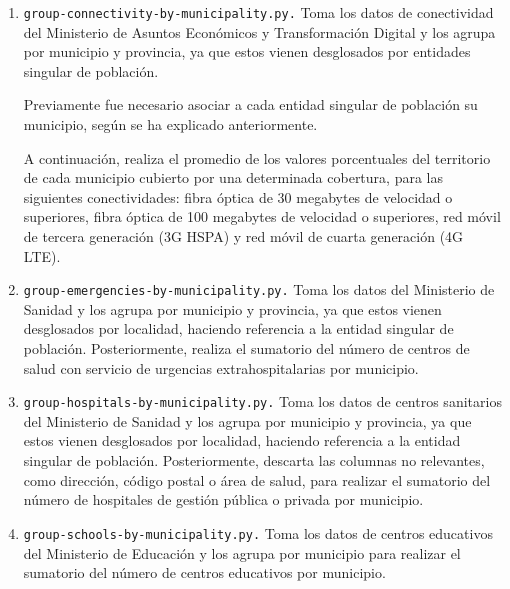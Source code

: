 \begin{enumerate}
    \item \texttt{group-connectivity-by-municipality.py.} Toma los datos de conectividad del Ministerio de Asuntos Económicos y Transformación Digital y los agrupa por municipio y provincia, ya que estos vienen desglosados por entidades singular de población.

    
    Previamente fue necesario asociar a cada entidad singular de población su municipio, según se ha explicado anteriormente.

    
    A continuación, realiza el promedio de los valores porcentuales del territorio de cada municipio cubierto por una determinada cobertura, para las siguientes conectividades: fibra óptica de 30 megabytes de velocidad o superiores, fibra óptica de 100 megabytes de velocidad o superiores, red móvil de tercera generación (3G HSPA) y red móvil de cuarta generación (4G LTE).

    \item \texttt{group-emergencies-by-municipality.py.} Toma los datos del Ministerio de Sanidad y los agrupa por municipio y provincia, ya que estos vienen desglosados por localidad, haciendo referencia a la entidad singular de población. Posteriormente, realiza el sumatorio del número de centros de salud con servicio de urgencias extrahospitalarias por municipio.

    \item \texttt{group-hospitals-by-municipality.py.} Toma los datos de centros sanitarios del Ministerio de Sanidad y los agrupa por municipio y provincia, ya que estos vienen desglosados por localidad, haciendo referencia a la entidad singular de población. Posteriormente, descarta las columnas no relevantes, como dirección, código postal o área de salud, para realizar el sumatorio del número de hospitales de gestión pública o privada por municipio.
    
    \item \texttt{group-schools-by-municipality.py.} Toma los datos de centros educativos del Ministerio de Educación y los agrupa por municipio para realizar el sumatorio del número de centros educativos por municipio.
    

\end{enumerate}
